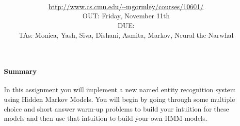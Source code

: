 \documentclass[11pt,addpoints,answers]{exam}
\title{\textsc{\hwName}
} %
\author{\courseName\\
\url{http://www.cs.cmu.edu/~mgormley/courses/10601/} \\
OUT: Friday, November 11th \\
DUE: \dueDate{} \\ 
TAs: Monica, Yash, Siva, Dishani, Asmita, Markov, Neural the Narwhal
}
\date{}
\date{}
\begin{document}
\maketitle

\begin{notebox}
\paragraph{Summary} In this assignment you will implement a new named entity recognition system using Hidden Markov Models. You will begin by going through some multiple choice and short answer warm-up problems to build your intuition for these models and then use that intuition to build your own HMM models.
\end{notebox}\vspace*{-3mm}
\newcommand \maxsubs {10 }
\end{document}
